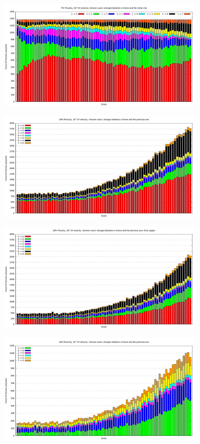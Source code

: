 \documentclass[10pt, oneside]{article} %
\begin{document}
\begin{figure}[H]
\centering
\includegraphics[width=10cm]{Figures/Porosidad/Porosidad_2vel_comp_voronoi_hist9.png}
\caption{}
\label{fg:18comp}
\end{figure}

\begin{figure}[H]
\centering
\includegraphics[width=10cm]{Figures/Porosidad/Porosidad_2vel_comp_voronoi_hist10.png}
\caption{}
\label{fg:19comp}
\end{figure}

\begin{figure}[H]
\centering
\includegraphics[width=10cm]{Figures/Porosidad/Porosidad_2vel_comp_voronoi_hist11.png}
\caption{}
\end{figure}

\begin{figure}[H]
\centering
\includegraphics[width=10cm]{Figures/Porosidad/Porosidad_2vel_comp_voronoi_hist12.png}
\caption{}
\end{figure}
\end{document}
